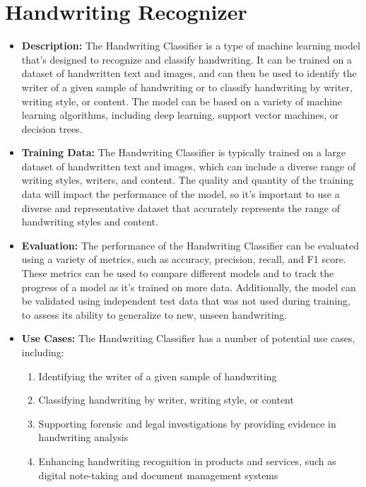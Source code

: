 \section{Handwriting Recognizer}

\begin{itemize}
    \item \textbf{Description:} The Handwriting Classifier is a type of machine learning model that's designed to recognize and classify handwriting. It can be trained on a dataset of handwritten text and images, and can then be used to identify the writer of a given sample of handwriting or to classify handwriting by writer, writing style, or content. The model can be based on a variety of machine learning algorithms, including deep learning, support vector machines, or decision trees.
    \item \textbf{Training Data:} The Handwriting Classifier is typically trained on a large dataset of handwritten text and images, which can include a diverse range of writing styles, writers, and content. The quality and quantity of the training data will impact the performance of the model, so it's important to use a diverse and representative dataset that accurately represents the range of handwriting styles and content.
    \item \textbf{Evaluation:} The performance of the Handwriting Classifier can be evaluated using a variety of metrics, such as accuracy, precision, recall, and F1 score. These metrics can be used to compare different models and to track the progress of a model as it's trained on more data. Additionally, the model can be validated using independent test data that was not used during training, to assess its ability to generalize to new, unseen handwriting.
    \item \textbf{Use Cases:} The Handwriting Classifier has a number of potential use cases, including:
        \begin{enumerate}  
            \item Identifying the writer of a given sample of handwriting
            \item Classifying handwriting by writer, writing style, or content
            \item Supporting forensic and legal investigations by providing evidence in handwriting analysis
            \item Enhancing handwriting recognition in products and services, such as digital note-taking and document management systems
        \end{enumerate}

\end{itemize}
